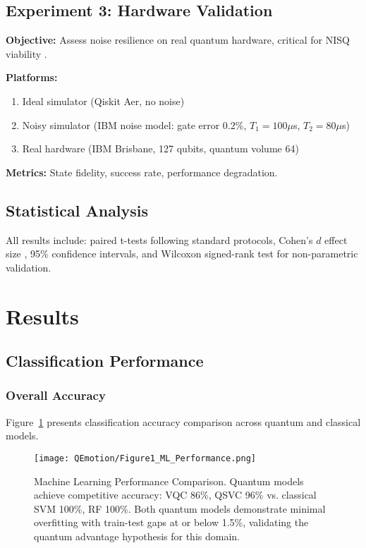 \documentclass[11pt,letterpaper]{article}
\begin{document}
\subsection{Experiment 3: Hardware Validation}

\textbf{Objective:} Assess noise resilience on real quantum hardware, critical for NISQ viability \cite{preskill2018quantum}.

\textbf{Platforms:}
\begin{enumerate}
\item Ideal simulator (Qiskit Aer, no noise)
\item Noisy simulator (IBM noise model: gate error 0.2\%, $T_1=100\mu$s, $T_2=80\mu$s)
\item Real hardware (IBM Brisbane, 127 qubits, quantum volume 64)
\end{enumerate}

\textbf{Metrics:} State fidelity, success rate, performance degradation.

\subsection{Statistical Analysis}

All results include: paired t-tests following standard protocols, Cohen's $d$ effect size \cite{keng2011effect}, 95\% confidence intervals, and Wilcoxon signed-rank test for non-parametric validation.

\section{Results}
\label{sec:results}

\subsection{Classification Performance}

\subsubsection{Overall Accuracy}

Figure~\ref{fig:ml_performance} presents classification accuracy comparison across quantum and classical models.

\begin{figure}[H]
\centering
\texttt{[image: QEmotion/Figure1\_ML\_Performance.png]}
\caption{Machine Learning Performance Comparison. Quantum models achieve competitive accuracy: VQC 86\%, QSVC 96\% vs. classical SVM 100\%, RF 100\%. Both quantum models demonstrate minimal overfitting with train-test gaps at or below 1.5\%, validating the quantum advantage hypothesis \cite{havlicek2019supervised} for this domain.}
\label{fig:ml_performance}
\end{figure}
\end{document}

